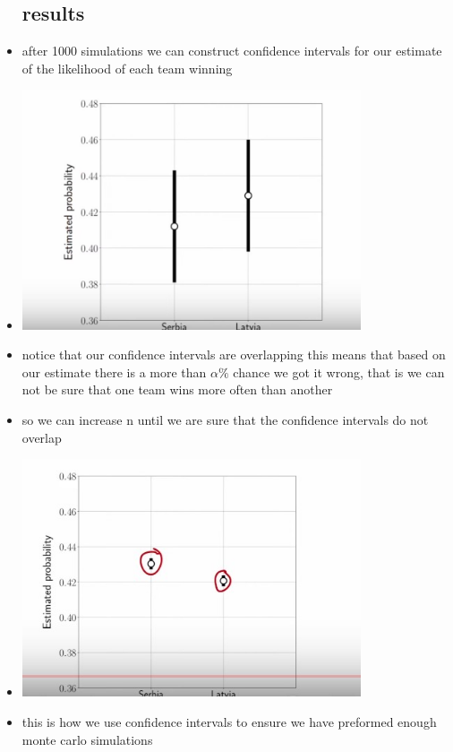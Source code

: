 \documentclass{article}
\begin{document}
\begin{itemize}
\subsection{results }
\item after 1000 simulations we can construct confidence intervals for our estimate of the likelihood of each team winning 
\item \includegraphics[width=10cm]{notes/week_4/vidio 5:CONFIDENCE INTERVALS FOR PROBABILITIES AND PROPORTIONS/immages/v4_4.jpg}
\item notice that our confidence intervals are overlapping this means that based on our estimate there is a more than $\alpha\%$ chance we got it wrong, that is we can not be sure that one team wins more often than another 
\item so we can increase n until we are sure that the confidence intervals do not overlap 
\item  \includegraphics[width=10cm]{notes/week_4/vidio 5:CONFIDENCE INTERVALS FOR PROBABILITIES AND PROPORTIONS/immages/v4_5.jpg}
\item this is how we use confidence intervals to ensure we have preformed enough monte carlo simulations 

\end{itemize}
\end{document}
